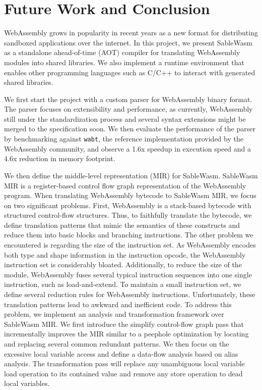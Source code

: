 \chapter{Future Work and Conclusion}

WebAssembly grows in popularity in recent years as a new format for distributing sandboxed applications over the internet. In this project, we present SableWasm as a standalone ahead-of-time (AOT) compiler for translating WebAssembly modules into shared libraries. We also implement a runtime environment that enables other programming languages such as C/C++ to interact with generated shared libraries.

We first start the project with a custom parser for WebAssembly binary format. The parser focuses on extensibility and performance, as currently, WebAssembly still under the standardization process and several syntax extensions might be merged to the specification soon. We then evaluate the performance of the parser by benchmarking against \texttt{wabt}, the reference implementation provided by the WebAssembly community, and observe a 1.6x speedup in execution speed and a 4.6x reduction in memory footprint. 

We then define the middle-level representation (MIR) for SableWasm. SableWasm MIR is a register-based control flow graph representation of the WebAssembly program. When translating WebAssembly bytecode to SableWasm MIR, we focus on two significant problems. First, WebAssembly is a stack-based bytecode with structured control-flow structures. Thus, to faithfully translate the bytecode, we define translation patterns that mimic the semantics of these constructs and reduce them into basic blocks and branching instructions. The other problem we encountered is regarding the size of the instruction set. As WebAssembly encodes both type and shape information in the instruction opcode, the WebAssembly instruction set is considerably bloated. Additionally, to reduce the size of the module, WebAssembly fuses several typical instruction sequences into one single instruction, such as load-and-extend. To maintain a small instruction set, we define several reduction rules for WebAssembly instructions. Unfortunately, these translation patterns lead to awkward and inefficient code. To address this problem, we implement an analysis and transformation framework over SableWasm MIR. We first introduce the simplify control-flow graph pass that incrementally improves the MIR similar to a peephole optimization by locating and replacing several common redundant patterns. We then focus on the excessive local variable access and define a data-flow analysis based on alias analysis. The transformation pass will replace any unambiguous local variable load operation to its contained value and remove any store operation to dead local variables. 

